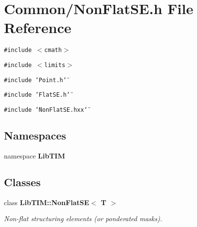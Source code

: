 \section{Common/Non\-Flat\-SE.h File Reference}
\label{NonFlatSE_8h}
{\tt \#include $<$cmath$>$}\par
{\tt \#include $<$limits$>$}\par
{\tt \#include \char`\"{}Point.h\char`\"{}}\par
{\tt \#include \char`\"{}Flat\-SE.h\char`\"{}}\par
{\tt \#include \char`\"{}Non\-Flat\-SE.hxx\char`\"{}}\par
\subsection*{Namespaces}
\begin{CompactItemize}
\item 
namespace {\bf Lib\-TIM}
\end{CompactItemize}
\subsection*{Classes}
\begin{CompactItemize}
\item 
class {\bf Lib\-TIM::Non\-Flat\-SE$<$ T $>$}
\begin{CompactList}\small\item\em Non-flat structuring elements (or ponderated masks). \item\end{CompactList}\end{CompactItemize}
